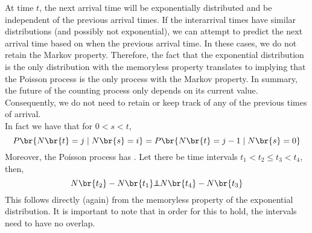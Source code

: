 \documentclass{article}
\newcommand{\indep}{\!\!\perp\!\!\!\!\perp\!\!}
\begin{document}
    \begin{center}
    \end{center}
    At time $t$, the next arrival time will be exponentially distributed and be independent of the previous arrival times. If the interarrival times have similar distributions (and possibly not exponential), we can attempt to predict the next arrival time based on when the previous arrival time. In these cases, we do not retain the Markov property. Therefore, the fact that the exponential distribution is the only distribution with the memoryless property translates to implying that the Poisson process is the only process with the Markov property. In summary, the future of the counting process only depends on its current value. Consequently, we do not need to retain or keep track of any of the previous times of arrival. \\

    In fact we have that for $0 < s < t$,
    \[ P\br{N\br{t} = j \mid N\br{s} = i} = P\br{N\br{t} = j-1 \mid N\br{s} = 0} \]
    Moreover, the Poisson process has . Let there be time intervals $t_1 < t_2 \leq t_3 < t_4$, then,
    \[ N\br{t_2} - N\br{t_1} \indep N\br{t_4} - N\br{t_3} \]
    This follows directly (again) from the memoryless property of the exponential distribution. It is important to note that in order for this to hold, the intervals need to have no overlap. \\
\end{document}
